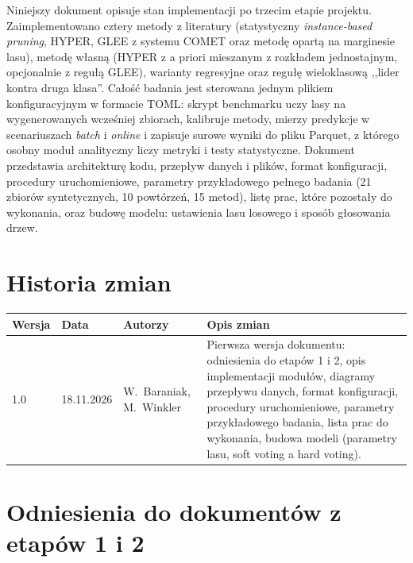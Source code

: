 \documentclass{article}
\begin{document}
Niniejszy dokument opisuje stan implementacji po trzecim etapie projektu. Zaimplementowano
cztery metody z literatury (statystyczny \emph{instance-based pruning}, HYPER, GLEE z
systemu COMET oraz metodę opartą na marginesie lasu), metodę własną (HYPER z a priori
mieszanym z rozkładem jednostajnym, opcjonalnie z regułą GLEE), warianty regresyjne
oraz regułę wieloklasową ,,lider kontra druga klasa''. Całość badania jest sterowana jednym
plikiem konfiguracyjnym w formacie TOML: skrypt benchmarku uczy lasy na wygenerowanych
wcześniej zbiorach, kalibruje metody, mierzy predykcje w scenariuszach \emph{batch}
i \emph{online} i zapisuje surowe wyniki do pliku Parquet, z którego osobny moduł
analityczny liczy metryki i testy statystyczne.
Dokument przedstawia architekturę kodu, przepływ danych i plików, format konfiguracji,
procedury uruchomieniowe, parametry przykładowego pełnego badania (21 zbiorów
syntetycznych, 10 powtórzeń, 15 metod), listę prac, które pozostały do wykonania, oraz
budowę modelu: ustawienia lasu losowego i sposób głosowania drzew.

\section*{Historia zmian}

\begin{table}[H]
\centering
\small
\begin{tabularx}{\textwidth}{@{}llp{3.6cm}X@{}}
\toprule
\textbf{Wersja} & \textbf{Data} & \textbf{Autorzy} & \textbf{Opis zmian} \\
\midrule
1.0 & 18.11.2026 & W.~Baraniak, M.~Winkler &
Pierwsza wersja dokumentu: odniesienia do etapów 1 i 2, opis implementacji modułów,
diagramy przepływu danych, format konfiguracji, procedury uruchomieniowe, parametry
przykładowego badania, lista prac do wykonania, budowa modeli (parametry lasu,
soft voting a hard voting). \\
\bottomrule
\end{tabularx}
\end{table}

\section{Odniesienia do dokumentów z etapów 1 i 2}
\end{document}
